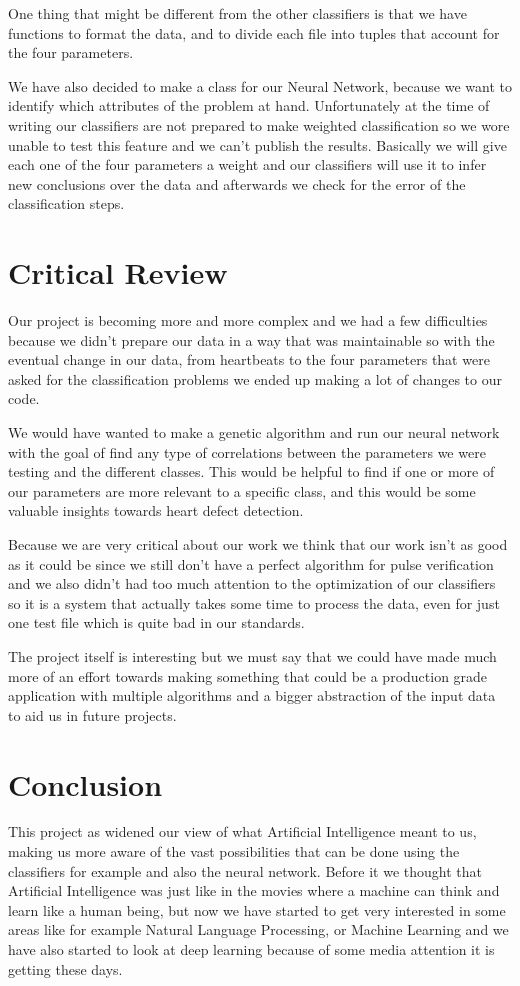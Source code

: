 \documentclass[conference]{IEEEtran}
\begin{document}
One thing that might be different from the other classifiers is that we have
functions to format the data, and to divide each file into tuples that account
for the four parameters.

We have also decided to make a class for our Neural Network, because we want to
identify which attributes of the problem at hand. Unfortunately at the time of
writing our classifiers are not prepared to make weighted classification so we
wore unable to test this feature and we can't publish the results.
Basically we will give each one of the four parameters a weight and our
classifiers will use it to infer new conclusions over the data and afterwards
we check for the error of the classification steps.

\section{Critical Review}
Our project is becoming more and more complex and we had a few difficulties
because we didn't prepare our data in a way that was maintainable so with the
eventual change in our data, from heartbeats to the four parameters that were
asked for the classification problems we ended up making a lot of changes to our
code.

We would have wanted to make a genetic algorithm and run our neural network with
the goal of find any type of correlations between the parameters we were testing
and the different classes. This would be helpful to find if one or more of our
parameters are more relevant to a specific class, and this would be some
valuable insights towards heart defect detection.

Because we are very critical about our work we think that our work isn't as
good as it could be since we still don't have a perfect algorithm for pulse
verification and we also didn't had too much attention to the optimization of
our classifiers so it is a system that actually takes some time to process the
data, even for just one test file which is quite bad in our standards.

The project itself is interesting but we must say that we could have made much
more of an effort towards making something that could be a production grade
application with multiple algorithms and a bigger abstraction of the input data
to aid us in future projects.
\section{Conclusion}
This project as widened our view of what Artificial Intelligence meant to us,
making us more aware of the vast possibilities that can be done using the
classifiers for example and also the neural network. Before it we thought that
Artificial Intelligence was just like in the movies where a machine can think
and learn like a human being, but now we have started to get very interested in
some areas like for example Natural Language Processing, or Machine Learning and
we have also started to look at deep learning because of some media attention
it is getting these days.
\end{document}
